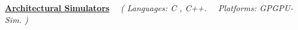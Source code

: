 \begin{cvprojects}
    \par\addvspace{1ex}
    \begin{flushleft}
    \par\addvspace{-1.5mm}
    \fontsize{10.4pt}{1em}\selectfont\underline{\textbf{\color{black}Architectural Simulators}} \ \ \textit{(\color{text} Languages: C , C++. \ \ Platforms: GPGPU-Sim. )}
    \end{flushleft}
    \par\addvspace{0.3ex}

\end{cvprojects}